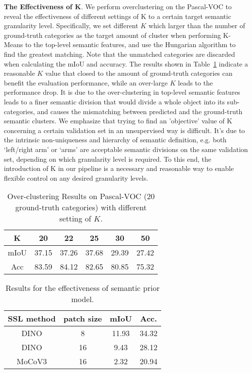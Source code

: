 \documentclass[runningheads]{llncs}
\newcommand{\PAR}[1]{\smallskip \noindent \textbf{#1}}
\newcommand{\tabref}[1]{Table~\ref{#1}}
\begin{document}
\PAR{The Effectiveness of K}. We perform overclustering on the Pascal-VOC to reveal the effectiveness of different settings of K to a certain target semantic granularity level. 
Specifically, we set different $K$ which larger than the number of ground-truth categories as the target amount of cluster when performing K-Means to the top-level semantic features, and use the Hungarian algorithm to find the greatest matching. Note that the unmatched categories are discarded when calculating the mIoU and accuracy. The results shown in \tabref{tab:overclustering} indicate a reasonable $K$ value that closed to the amount of ground-truth categories can benefit the evaluation performance, while an over-large $K$ leads to the performance drop. It is due to the over-clustering in top-level semantic features leads to a finer semantic division that would divide a whole object into its sub-categories, and causes the mismatching between predicted and the ground-truth semantic clusters. We emphasize that trying to find an 'objective' value of K concerning a certain validation set in an unsupervised way is difficult. It’s due to the intrinsic non-uniqueness and hierarchy of semantic definition, e.g. both ‘left/right arm’ or ‘arms’ are acceptable semantic divisions on the same validation set, depending on which granularity level is required. To this end, the introduction of K in our pipeline is a necessary and reasonable way to enable flexible control on any desired granularity levels.


\begin{multicols}{2}



\begin{table}[H]
    \centering
    \small
    \caption{Over-clustering Results on Pascal-VOC (20 ground-truth categories) with different setting of $K$.\label{tab:overclustering}}
    \begin{tabular}{c|ccccc}
        \toprule
        {K} & {20} & {22} & {25} & {30} & {50} \tabularnewline
        \midrule
        {mIoU}  & 37.15 & 37.26 & 37.68 & 29.39 & 27.42  \tabularnewline
        {Acc}  & 83.59 & 84.12 & 82.65 & 80.85 & 75.32 \tabularnewline
        \bottomrule
    \end{tabular}
\end{table}

\begin{table}[H]
    \centering 
    \small
    \caption{Results for the effectiveness of semantic prior model.\label{tab:ab:semantic_prior}}
    \begin{tabular}{cc|cc}
        \toprule
        {SSL method} & {patch size} & {mIoU} & {Acc.} \tabularnewline
        \midrule
        DINO & 8 & 11.93 & 34.32 \tabularnewline
        DINO & 16 & 9.43 & 28.12 \tabularnewline
        MoCoV3 & 16 & 2.32 & 20.94 \tabularnewline
        \bottomrule
    \end{tabular}
\end{table}





\end{multicols}
\end{document}
